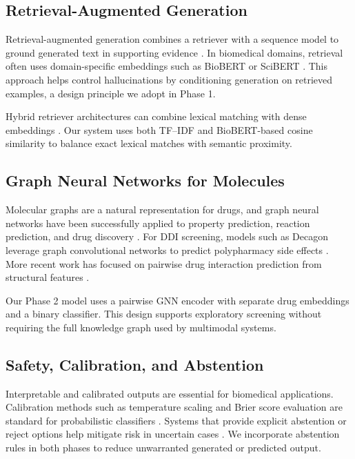\documentclass[conference]{IEEEtran}
\begin{document}
\subsection{Retrieval-Augmented Generation}
Retrieval-augmented generation combines a retriever with a sequence model to ground generated text in supporting evidence \cite{lewis2020retrieval, izacard2020leveraging}. In biomedical domains, retrieval often uses domain-specific embeddings such as BioBERT or SciBERT \cite{lee2020biobert, beltagy2019scibert}. This approach helps control hallucinations by conditioning generation on retrieved examples, a design principle we adopt in Phase 1.

Hybrid retriever architectures can combine lexical matching with dense embeddings \cite{karpukhin2020dense, khattab2020colbert}. Our system uses both TF--IDF and BioBERT-based cosine similarity to balance exact lexical matches with semantic proximity.

\subsection{Graph Neural Networks for Molecules}
Molecular graphs are a natural representation for drugs, and graph neural networks have been successfully applied to property prediction, reaction prediction, and drug discovery \cite{gilmer2017neural, wu2018moleculenet, yin2021moleculenet}. For DDI screening, models such as Decagon leverage graph convolutional networks to predict polypharmacy side effects \cite{zitnik2018decagon}. More recent work has focused on pairwise drug interaction prediction from structural features \cite{nguyen2020graph, zhao2021deepddi}.

Our Phase 2 model uses a pairwise GNN encoder with separate drug embeddings and a binary classifier. This design supports exploratory screening without requiring the full knowledge graph used by multimodal systems.

\subsection{Safety, Calibration, and Abstention}
Interpretable and calibrated outputs are essential for biomedical applications. Calibration methods such as temperature scaling and Brier score evaluation are standard for probabilistic classifiers \cite{guo2017calibration, nobel2020calibration}. Systems that provide explicit abstention or reject options help mitigate risk in uncertain cases \cite{el2010foundations, geifman2017selective}. We incorporate abstention rules in both phases to reduce unwarranted generated or predicted output.
\end{document}
